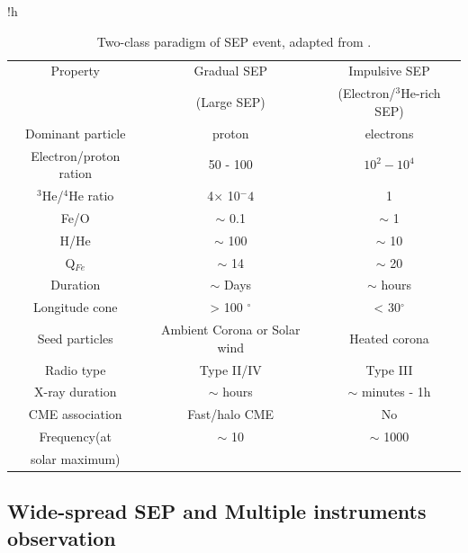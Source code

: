 \begin{table}{!h}
	\centering
	\caption[Two classes of SEP events]{Two-class paradigm of \ac{SEP} event, adapted from \citet{kallenrode2003current,	Desai_Diacalone2016LRSP, Wang2009}.}
	\begin{tabular}{c|c|c}
		\hline
		\hline
		Property 	& Gradual \ac{SEP} 	& Impulsive \ac{SEP} \\
					& (Large \ac{SEP})	& (Electron/$^3$He-rich \ac{SEP}) \\
		\hline
		Dominant particle	& proton	& electrons \\
		Electron/proton ration &  50 - 100 &  $10^2 - 10^4$  \\
		$^3$He/$^4$He ratio	& 4$\times$ 10$^-4$ & 1 \\
		Fe/O			& $\sim$ 0.1			& $\sim$ 1	 \\
		H/He		 	& $\sim$ 100			& $\sim$ 10 \\
		Q$_{Fe}$		& $\sim$ 14 			& $\sim$ 20 \\
		Duration		& $\sim$ Days			& $\sim$ hours \\
		Longitude cone	& > 100 $^\circ$		& < 30$^\circ$ \\
		Seed particles	& Ambient Corona or Solar wind & Heated corona \\
		Radio type		& Type II/IV	& Type III \\
		X-ray duration	& $\sim$ hours	& $\sim$ minutes - 1h \\
		CME association	& Fast/halo CME	& No	\\
		Frequency(at 	& $\sim$ 10	& $\sim$ 1000 \\
		solar maximum)	& 	& 	\\
		\hline
	\end{tabular}
\label{Tab:Two_type_SEP}
\end{table}


\subsection{Wide-spread SEP and Multiple instruments observation}


